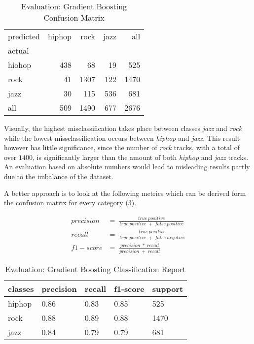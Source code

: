 \begin{table}[H]
  \centering
  \begin{tabular}{lrrrr}
    \toprule
    predicted & hiphop & rock & jazz &   all \\
    actual &      &       &      &       \\
    \midrule
    hiohop &  438 &    68 &   19 &   525 \\
    rock   &   41 &  1307 &  122 &  1470 \\
    jazz   &   30 &   115 &  536 &   681 \\
    all    &  509 &  1490 &  677 &  2676 \\
    \bottomrule
    \end{tabular}
  \caption{Evaluation: Gradient Boosting Confusion Matrix}%
  \label{tbl:gb_confusion_matrix}%
\end{table} 

Visually, the highest misclassification takes place between classes \emph{jazz} and \emph{rock} while the lowest missclassification occurs
between \emph{hiphop} and \emph{jazz}. This result however has little significance, since the number of \emph{rock} tracks, with a total of over 
\(1400\), is significantly larger than the amount of both \emph{hiphop} and \emph{jazz} tracks. An evaluation based on absolute numbers would lead to 
misleading results partly due to the imbalance of the dataset. 

A better approach is to look at the following metrics which can be derived form the confusion matrix for every category \cite[p.235]{Davis_2006} (3). 

\begin{equation*}
  \begin{aligned}
    precision &= \;\frac{true\:positive}{true\:positive\;+\;false\:positive}
    \\
    recall &= \;\frac{true\:positive}{true\:positive\;+\;false\:negative}
    \\
    f1-score &= \;\frac{precision\;*\;recall}{precision\;+\;recall}
  \end{aligned}
\end{equation*}

\begin{table}[H]
  \centering
  \begin{tabular}{lllll}
    \toprule
    classes & precision & recall & f1-score & support \\
    \midrule
     hiphop &      0.86 &   0.83 &     0.85 &     525 \\
       rock &      0.88 &   0.89 &     0.88 &    1470 \\
       jazz &      0.84 &   0.79 &     0.79 &     681 \\
    \bottomrule
    \end{tabular}
  \caption{Evaluation: Gradient Boosting Classification Report}%
  \label{tbl:gb_classification_Report}%
\end{table} 

